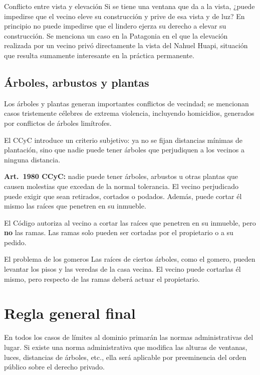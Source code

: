 \documentclass[12pt,oneside]{book}
\begin{document}
\begin{example}{Conflicto entre vista y elevación}
Si se tiene una ventana que da a la vista, ¿puede impedirse que el vecino eleve su construcción y prive de esa vista y de luz? En principio no puede impedirse que el lindero ejerza su derecho a elevar su construcción. Se menciona un caso en la Patagonia en el que la elevación realizada por un vecino privó directamente la vista del Nahuel Huapi, situación que resulta sumamente interesante en la práctica permanente.
\end{example}

\subsection{Árboles, arbustos y plantas}

Los árboles y plantas generan importantes conflictos de vecindad; se mencionan casos tristemente célebres de extrema violencia, incluyendo homicidios, generados por conflictos de árboles limítrofes.

El CCyC introduce un criterio subjetivo: ya no se fijan distancias mínimas de plantación, sino que nadie puede tener árboles que perjudiquen a los vecinos a ninguna distancia.

\textbf{Art.~1980 CCyC:} nadie puede tener árboles, arbustos u otras plantas que causen molestias que excedan de la normal tolerancia. El vecino perjudicado puede exigir que sean retirados, cortados o podados. Además, puede cortar él mismo las raíces que penetren en su inmueble.

El Código autoriza al vecino a cortar las raíces que penetren en su inmueble, pero \textbf{no} las ramas. Las ramas solo pueden ser cortadas por el propietario o a su pedido.

\begin{example}{El problema de los gomeros}
Las raíces de ciertos árboles, como el gomero, pueden levantar los pisos y las veredas de la casa vecina. El vecino puede cortarlas él mismo, pero respecto de las ramas deberá actuar el propietario.
\end{example}

\section{Regla general final}

\begin{important}
En todos los casos de límites al dominio primarán las normas administrativas del lugar. Si existe una norma administrativa que modifica las alturas de ventanas, luces, distancias de árboles, etc., ella será aplicable por preeminencia del orden público sobre el derecho privado.
\end{important}
\end{document}

